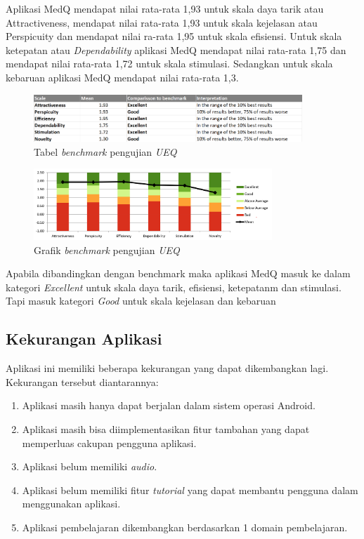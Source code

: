 Aplikasi MedQ mendapat nilai rata-rata 1,93 untuk skala daya tarik atau 
Attractiveness, mendapat nilai rata-rata 1,93 untuk skala kejelasan atau 
Perspicuity dan mendapat nilai ra-rata 1,95 untuk skala efisiensi. Untuk skala 
ketepatan atau \textit{Dependability} aplikasi MedQ mendapat nilai rata-rata 1,75 dan 
mendapat nilai rata-rata 1,72 untuk skala stimulasi. Sedangkan untuk skala 
kebaruan aplikasi MedQ mendapat nilai rata-rata 1,3. 
\begin{figure}[H]
	\centering
	\includegraphics[width=0.9\textwidth]{contents/chapter-4/images/BenchMark.png}
	\caption{Tabel \textit{benchmark} pengujian \textit{UEQ}}
	\label{Fig : benchmark}
\end{figure}
\begin{figure}[H]
	\centering
	\includegraphics[width=0.8\textwidth]{contents/chapter-4/images/BenchMark-graph.png}
	\caption{Grafik \textit{benchmark} pengujian \textit{UEQ}}
	\label{Fig : benchmark-graph}
\end{figure}
Apabila dibandingkan dengan benchmark maka aplikasi MedQ masuk ke 
dalam kategori \textit{Excellent} untuk skala daya tarik, efisiensi, ketepatanm dan stimulasi.
Tapi masuk kategori \textit{Good} untuk skala kejelasan dan kebaruan

\newpage
\subsection{Kekurangan Aplikasi}
Aplikasi ini memiliki beberapa kekurangan yang dapat dikembangkan lagi. Kekurangan tersebut diantarannya:
\begin{enumerate}
	\item Aplikasi masih hanya dapat berjalan dalam sistem operasi Android.
	\item Aplikasi masih bisa diimplementasikan fitur tambahan yang dapat memperluas cakupan pengguna aplikasi.
	\item Aplikasi belum memiliki \textit{audio}.
	\item Aplikasi belum memiliki fitur \textit{tutorial} yang dapat membantu pengguna dalam menggunakan aplikasi.
	\item Aplikasi pembelajaran dikembangkan berdasarkan 1 domain pembelajaran.
\end{enumerate}